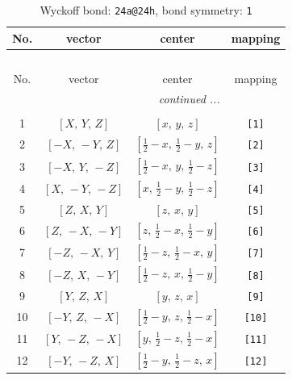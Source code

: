 \documentclass[fleqn,8pt]{jsarticle}
\begin{document}
\begin{longtable}{cccc}
\caption{Wyckoff bond: {\tt 24a@24h}, bond symmetry: {\tt 1}}
 \\
 \hline \hline
No. & vector & center & mapping \\ \hline \endfirsthead

\multicolumn{3}{l}{\tablename\ \thetable{}} \\
 \hline \hline
No. & vector & center & mapping \\ \hline \endhead

 \hline \hline
\multicolumn{3}{r}{\footnotesize\it continued ...} \\ \endfoot

 \hline \hline
\multicolumn{3}{r}{} \\ \endlastfoot

1 & $\left[ X,\, Y,\, Z \right]$ & $\left[ x,\, y,\, z \right]$ & {\tt [1]} \\ \hline
2 & $\left[ - X,\, - Y,\, Z \right]$ & $\left[ \frac{1}{2} - x,\, \frac{1}{2} - y,\, z \right]$ & {\tt [2]} \\ \hline
3 & $\left[ - X,\, Y,\, - Z \right]$ & $\left[ \frac{1}{2} - x,\, y,\, \frac{1}{2} - z \right]$ & {\tt [3]} \\ \hline
4 & $\left[ X,\, - Y,\, - Z \right]$ & $\left[ x,\, \frac{1}{2} - y,\, \frac{1}{2} - z \right]$ & {\tt [4]} \\ \hline
5 & $\left[ Z,\, X,\, Y \right]$ & $\left[ z,\, x,\, y \right]$ & {\tt [5]} \\ \hline
6 & $\left[ Z,\, - X,\, - Y \right]$ & $\left[ z,\, \frac{1}{2} - x,\, \frac{1}{2} - y \right]$ & {\tt [6]} \\ \hline
7 & $\left[ - Z,\, - X,\, Y \right]$ & $\left[ \frac{1}{2} - z,\, \frac{1}{2} - x,\, y \right]$ & {\tt [7]} \\ \hline
8 & $\left[ - Z,\, X,\, - Y \right]$ & $\left[ \frac{1}{2} - z,\, x,\, \frac{1}{2} - y \right]$ & {\tt [8]} \\ \hline
9 & $\left[ Y,\, Z,\, X \right]$ & $\left[ y,\, z,\, x \right]$ & {\tt [9]} \\ \hline
10 & $\left[ - Y,\, Z,\, - X \right]$ & $\left[ \frac{1}{2} - y,\, z,\, \frac{1}{2} - x \right]$ & {\tt [10]} \\ \hline
11 & $\left[ Y,\, - Z,\, - X \right]$ & $\left[ y,\, \frac{1}{2} - z,\, \frac{1}{2} - x \right]$ & {\tt [11]} \\ \hline
12 & $\left[ - Y,\, - Z,\, X \right]$ & $\left[ \frac{1}{2} - y,\, \frac{1}{2} - z,\, x \right]$ & {\tt [12]} \\ \hline

\end{longtable}
\end{document}
